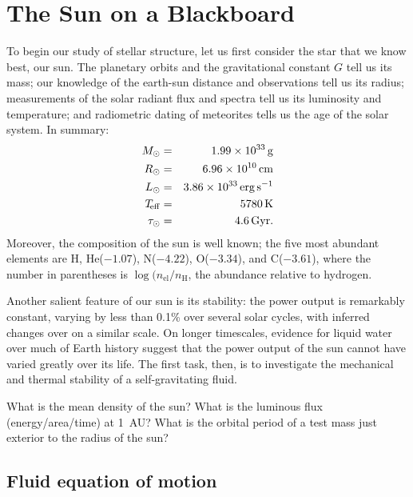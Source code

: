 \chapter{The Sun on a Blackboard}\label{ch.introduction}

To begin our study of stellar structure, let us first consider the star that we know best, our sun.  The planetary orbits and the gravitational constant $G$ tell us its mass; our knowledge of the earth-sun distance and observations tell us its radius; measurements of the solar radiant flux and spectra tell us its luminosity and temperature; and radiometric dating of meteorites tells us the age of the solar system. In summary:
\begin{eqnarray*}
M_\odot &=& 1.99\times 10^{33}\,\mathrm{g}\\
R_{\odot} &=& 6.96\times 10^{10}\,\mathrm{c}\mathrm{m}\\
L_{\odot} &=& 3.86\times 10^{33}\,\mathrm{erg}\,{\mathrm{s}}^{-1}\\
T_{\!\mathrm{eff}} &=& 5780\,\mathrm{K}\\
\tau_{\odot} &=& 4.6\,\mathrm{G}\mathrm{yr}.
\end{eqnarray*}
Moreover, the composition of the sun is well known\cite{anders.grevesse:abundances,Asplund2005The-Solar-Chemi}; the five most abundant elements are H, He($-1.07$), N($-4.22$), O($-3.34$), and C($-3.61$), where the number in parentheses is $\log(n_{\mathrm{el}}/n_{\mathrm{H}}$, the abundance relative to hydrogen.

Another salient feature of our sun is its stability: the power output is remarkably constant, varying by less than 0.1\% over several solar cycles\cite{Willson1991The-suns-lumino}, with inferred changes over  on a similar scale\cite{Frohlich2004Solar-radiative}.  On longer timescales, evidence for liquid water over much of Earth history suggest that the power output of the sun cannot have varied greatly over its life.  The first task, then, is to investigate the mechanical and thermal stability of a self-gravitating fluid.

\begin{exercisebox}
What is the mean density of the sun? What is the luminous flux (energy/area/time) at 1~AU? What is the orbital period of a test mass just exterior to the radius of the sun?
\end{exercisebox}

\section{Fluid equation of motion}\label{s.fluid-introduction}

